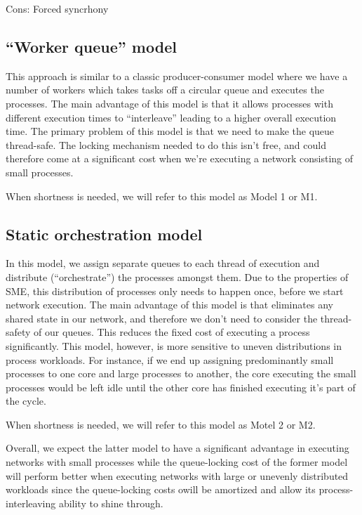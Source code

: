 Cons: Forced syncrhony 

\subsection{``Worker queue'' model}
This approach is similar to a classic producer-consumer model where we
have a number of workers which takes tasks off a circular queue and
executes the processes. The main advantage of this model is that it
allows processes with different execution times to ``interleave''
leading to a higher overall execution time. The primary problem of
this model is that we need to make the queue thread-safe. The locking
mechanism needed to do this isn't free, and could therefore come at a
significant cost when we're executing a network consisting of small
processes.

When shortness is needed, we will refer to this model as Model 1 or M1.

\subsection{Static orchestration model}
In this model, we assign separate queues to each thread of execution
and distribute (``orchestrate'') the processes amongst them. Due to
the properties of SME, this distribution of processes only needs to
happen once, before we start network execution. The main advantage of
this model is that eliminates any shared state in our network, and
therefore we don't need to consider the thread-safety of our
queues. This reduces the fixed cost of executing a process
significantly. This model, however, is more sensitive to uneven
distributions in process workloads. For instance, if we end up
assigning predominantly small processes to one core and large
processes to another, the core executing the small processes would be
left idle until the other core has finished executing it's part of the
cycle.

When shortness is needed, we will refer to this model as Motel 2 or M2.

Overall, we expect the latter model to have a significant advantage in
executing networks with small processes while the queue-locking cost
of the former model will perform better when executing networks with
large or unevenly distributed workloads since the queue-locking costs
owill be amortized and allow its process-interleaving ability to shine
through.


